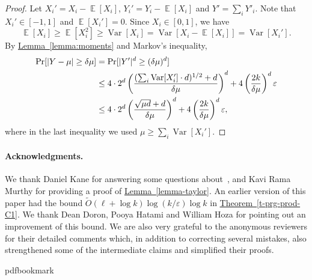 \documentclass[11pt]{article}
\numberwithin{equation}{section}
\theoremstyle{definition}
\theoremstyle{plain}
\newcommand{\expref}[2]{\hyperref[#2]{#1~\ref{#2}}}
\def\eps{\varepsilon}
\def\Blocklength{\ell}
\DeclarePairedDelimiter{\abs}{\lvert}{\rvert}
\DeclareMathOperator*{\E}{\mathbb{E}}                 %
\DeclareMathOperator*{\Var}{Var}                 %
\begin{document}
  \tailbound*

  \begin{proof}
    Let $X_i' = X_i - \E[X_i]$, $Y_i' = Y_i - \E[X_i]$ and $Y' = \sum_i Y'_i$.
    Note that $X_i' \in [-1,1]$ and $\E[X_i'] = 0$.
    Since $X_i \in [0,1]$, we have
    \[
      \E[X_i] \ge \E[X_i^2] \ge \Var[X_i] = \Var[X_i - \E[X_i]] = \Var[X_i'] .
    \]
    By \expref{Lemma}{lemma:moments} and Markov's inequality,
    \begin{align*}
      \Pr[ \abs{Y - \mu} \ge \delta \mu ]
      &= \Pr[ \abs{Y'}^d \ge (\delta \mu)^d ] \\
      &\le 4 \cdot 2^d \left( \frac{( \sum_i \Var[X_i'] \cdot d )^{1/2} + d}{ \delta \mu} \right)^d + 4 \left( \frac{2k}{\delta \mu} \right)^d \eps \\
      &\le 4 \cdot 2^d \left( \frac{\sqrt{\mu d} + d}{ \delta \mu} \right)^d + 4 \left( \frac{2k}{\delta \mu} \right)^d \eps,
    \end{align*}
		where in the last inequality we used $\mu \ge \sum_i \Var[X_i']$.
	\end{proof}



\paragraph{Acknowledgments.}  We thank Daniel Kane for answering some questions about~\cite{GopalanKM18}, and Kavi Rama Murthy for providing a proof of \expref{Lemma}{lemma-taylor}.
An earlier version of this paper had the bound $\tilde O(\Blocklength + \log k) \log(k/\eps) \log k$ in \expref{Theorem}{t-prg-prod-C1}.
We thank Dean Doron, Pooya Hatami and William Hoza for pointing out an improvement of this bound.
We are also very grateful to the anonymous reviewers for their detailed comments which, in addition to correcting several mistakes, also strengthened some of the intermediate claims and simplified their proofs.  


\providecommand{\bibhead}[1]{}
\expandafter\ifx\csname pdfbookmark\endcsname\relax%
  \providecommand{\tocrefpdfbookmark}{}
\else\providecommand{\tocrefpdfbookmark}{%
   \hypertarget{tocreferences}{}%
   \pdfbookmark[1]{References}{tocreferences}}%
\fi
\end{document}
